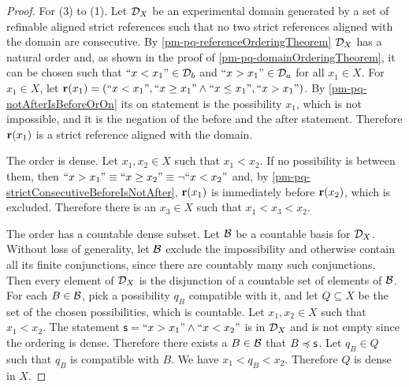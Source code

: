 \begin{mathSection}
\begin{proof}
		For (3) to (1). Let $\mathcal{D}_X$ be an experimental domain generated by a set of refinable aligned strict references such that no two strict references aligned with the domain are consecutive. By \ref{pm-pq-referenceOrderingTheorem} $\mathcal{D}_X$ has a natural order and, as shown in the proof of \ref{pm-pq-domainOrderingTheorem}, it can be chosen such that $``x < x_1" \in \mathcal{D}_b$ and $``x > x_1" \in \mathcal{D}_a$ for all $x_1 \in X$. For $x_1 \in X$, let $\textbf{r}(x_1) = (``x < x_1", ``x \geq x_1" \wedge ``x \leq x_1", ``x > x_1")$. By \ref{pm-pq-notAfterIsBeforeOrOn} its on statement is the possibility $x_1$, which is not impossible, and it is the negation of the before and the after statement. Therefore $\textbf{r}(x_1)$ is a strict reference aligned with the domain.

		The order is dense. Let $x_1, x_2 \in X$ such that $x_1 < x_2$. If no possibility is between them, then $``x > x_1" \equiv ``x \geq x_2" \equiv \neg ``x < x_2"$ and, by \ref{pm-pq-strictConsecutiveBeforeIsNotAfter}, $\textbf{r}(x_1)$ is immediately before $\textbf{r}(x_2)$, which is excluded. Therefore there is an $x_3 \in X$ such that $x_1 < x_3 < x_2$.

		The order has a countable dense subset. Let $\mathcal{B}$ be a countable basis for $\mathcal{D}_X$. Without loss of generality, let $\mathcal{B}$ exclude the impossibility and otherwise contain all its finite conjunctions, since there are countably many such conjunctions. Then every element of $\mathcal{D}_X$ is the disjunction of a countable set of elements of $\mathcal{B}$. For each $B \in \mathcal{B}$, pick a possibility $q_B$ compatible with it, and let $Q \subseteq X$ be the set of the chosen possibilities, which is countable. Let $x_1, x_2 \in X$ such that $x_1 < x_2$. The statement $\mathsf{s} = ``x > x_1" \wedge ``x < x_2"$ is in $\mathcal{D}_X$ and is not empty since the ordering is dense. Therefore there exists a $B \in \mathcal{B}$ that $B \preccurlyeq \mathsf{s}$. Let $q_B \in Q$ such that $q_B$ is compatible with $B$. We have $x_1 < q_B < x_2$. Therefore $Q$ is dense in $X$.


\end{proof}
\end{mathSection}
